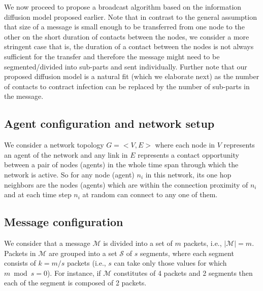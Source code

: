 \noindent
We now proceed to propose a broadcast algorithm based on the information diffusion model proposed earlier. 
Note that in contrast to the general assumption that size of a message is small enough to be transferred from one node to the other 
on the short duration of contacts between the nodes, we consider a more stringent case that is, the duration of a contact 
between the nodes is not always sufficient for the transfer and therefore the message might need to be 
segmented/divided into sub-parts and sent individually. Further note that our proposed diffusion model is a natural fit (which we elaborate next) as the 
number of contacts to contract infection can be replaced by the number of sub-parts in the message. 

\subsection{Agent configuration and network setup}
We consider a network topology $G = < V,E >$ where each node in $V$ represents an agent of the network and any link in $E$ represents a contact 
opportunity between a pair of nodes (agents) in the whole time span through which the network is active. So for any node (agent) $n_{i}$ in this network, its one hop 
neighbors are the nodes (agents) which are within the connection proximity of $n_{i}$ and at each time step $n_{i}$ at random can connect to any one of them. 


\subsection{Message configuration}
We consider that a message $\mathcal{M}$ is divided into a set of $m$ packets, i.e., $|\mathcal{M}| = m$. 
 Packets in $\mathcal{M}$ are grouped into a set $\mathcal{S}$ of $s$ segments, 
where each segment consists of $k = m/s$ packets (i.e., $s$ can take only those values for which $m \bmod s = 0$). 
For instance, if $\mathcal{M}$ constitutes of 4 packets and 2 segments then each of the segment is composed of 2 packets. 

